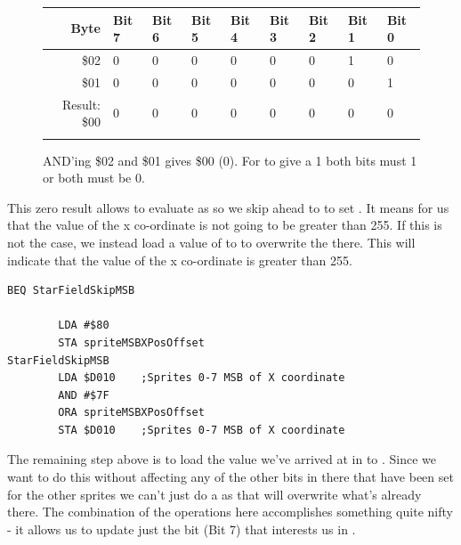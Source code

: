 \begin{figure}[H]
  {
    \setlength{\tabcolsep}{3.0pt}
    \setlength\cmidrulewidth{\heavyrulewidth} %
    \begin{adjustbox}{width=10cm,center}

      \begin{tabular}{rllllllll}
        \toprule
        Byte & Bit 7 & Bit 6 & Bit 5 & Bit 4 & Bit 3 & Bit 2 & Bit 1 & Bit 0        \\
        \midrule
        \$02 & 0 & 0 & 0 & 0 & 0 & 0 & 1 & 0 \\
        \$01 & 0 & 0 & 0 & 0 & 0 & 0 & 0 & 1 \\
        \midrule
        Result: \$00 & 0 & 0 & 0 & 0 & 0 & 0 & 0 & 0 \\
        \addlinespace
        \bottomrule
      \end{tabular}
    \end{adjustbox}
  }\caption*{AND'ing \$02 and \$01 gives \$00 (0). For  to give a 1 both bits must 1 or both must be 0.}
\end{figure}

This zero result allows  to evaluate as  so we skip ahead to 
to set .
It means for us that the value of the x co-ordinate is not going to be greater than 255. If this is not the case, we instead load a value of
 to  to overwrite the  there. This will indicate that the value of the x co-ordinate
is greater than 255.

\begin{lstlisting}[basicstyle=\tiny]
        BEQ StarFieldSkipMSB

        LDA #$80
        STA spriteMSBXPosOffset
StarFieldSkipMSB   
        LDA $D010    ;Sprites 0-7 MSB of X coordinate
        AND #$7F
        ORA spriteMSBXPosOffset
        STA $D010    ;Sprites 0-7 MSB of X coordinate
\end{lstlisting}

The remaining step above is to load the value we've arrived at in  to . Since we
want to do this without affecting any of the other bits in there that have been set for the other sprites we can't
just do a  as that will overwrite what's already there. The combination of the  operations
here accomplishes something quite nifty - it allows us to update just the bit (Bit 7) that interests us in .

